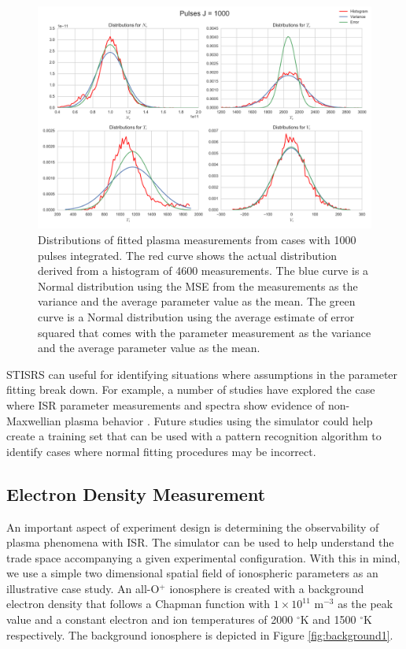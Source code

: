 \documentclass[draft,ras]{agutex}
\begin{document}
\begin{article}
\begin{figure}[!t]
\centering
\includegraphics[width=5in]{histsingle}
\caption{Distributions of fitted plasma measurements from cases with 1000 pulses integrated. The red curve shows the actual distribution derived from a histogram of 4600 measurements. The blue curve is a Normal distribution using the MSE from the measurements as the variance and the average parameter value as the mean.  The green curve is a Normal distribution using the average estimate of error squared that comes with the parameter measurement as the variance and the average parameter value as the mean.}
\label{fig:statshistsingle}
\end{figure}


STISRS can useful for identifying situations where assumptions in the parameter fitting break down. For example, a number of studies have explored the case where ISR parameter measurements and spectra show evidence of non-Maxwellian plasma behavior \citep[see, e.g.,][for AMISR examples]{Akbari:2012dz,Akbari:2015fv}. Future studies using the simulator could help create a training set that can be used with a pattern recognition algorithm to identify cases where normal fitting procedures may be incorrect.

\subsection{Electron Density Measurement}
An important aspect of experiment design is determining the observability of plasma phenomena with ISR. The simulator can be used to help understand the trade space accompanying a given experimental configuration. With this in mind, we use a simple two dimensional spatial field of ionospheric parameters as an illustrative case study. An all-O$^+$ ionosphere is created with a background electron density that follows a Chapman function with $1\times10^{11}$ m$^{-3}$ as the peak value and a constant electron and ion temperatures of 2000 $^\circ$K and 1500 $^\circ$K respectively. The background ionosphere is depicted in Figure \ref{fig:background1}.


\end{article}
\end{document}
